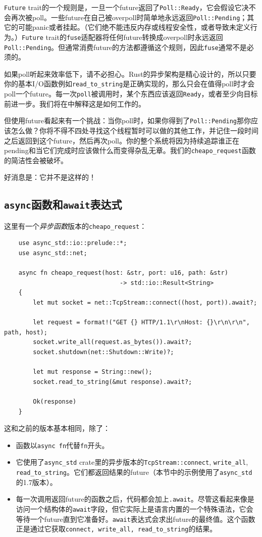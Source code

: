 \texttt{Future} trait的一个规则是，一旦一个future返回了\texttt{Poll::Ready}，它会假设它决不会再次被poll。一些future在自己被overpoll时简单地永远返回\texttt{Poll::Pending}；其它的可能panic或者挂起。（它们绝不能违反内存或线程安全性，或者导致未定义行为。）\texttt{Future} trait的\texttt{fuse}适配器将任何future转换成overpoll时永远返回\texttt{Poll::Pending}。但通常消费future的方法都遵循这个规则，因此\texttt{fuse}通常不是必须的。

如果poll听起来效率低下，请不必担心。Rust的异步架构是精心设计的，所以只要你的基本I/O函数例如\texttt{read\_to\_string}是正确实现的，那么只会在值得poll时才会poll一个future。每一次\texttt{poll}被调用时，某个东西应该返回\texttt{Ready}，或者至少向目标前进一步。我们将在中解释这是如何工作的。

但使用future看起来有一个挑战：当你poll时，如果你得到了\texttt{Poll::Pending}那你应该怎么做？你将不得不四处寻找这个线程暂时可以做的其他工作，并记住一段时间之后返回到这个future，然后再次poll。你的整个系统将因为持续追踪谁正在pending和当它们完成时应该做什么而变得杂乱无章。我们的\texttt{cheapo\_request}函数的简洁性会被破坏。

好消息是：它并不是这样的！

\subsection{\texttt{async}函数和\texttt{await}表达式}
这里有一个\emph{异步函数}版本的\texttt{cheapo\_request}：
\begin{verbatim}
    use async_std::io::prelude::*;
    use async_std::net;

    async fn cheapo_request(host: &str, port: u16, path: &str)
                                -> std::io::Result<String>
    {
        let mut socket = net::TcpStream::connect((host, port)).await?;

        let request = format!("GET {} HTTP/1.1\r\nHost: {}\r\n\r\n", path, host);
        socket.write_all(request.as_bytes()).await?;
        socket.shutdown(net::Shutdown::Write)?;

        let mut response = String::new();
        socket.read_to_string(&mut response).await?;

        Ok(response)
    }
\end{verbatim}

这和之前的版本基本相同，除了：
\begin{itemize}
    \item 函数以\texttt{async fn}代替\texttt{fn}开头。
    \item 它使用了\texttt{async\_std} crate里的异步版本的\texttt{TcpStream::connect}, \texttt{write\_all}, \\
    \texttt{read\_to\_string}。它们都返回结果的future（本节中的示例使用了\texttt{async\_std}的1.7版本）。
    \item 每一次调用返回future的函数之后，代码都会加上\texttt{.await}。尽管这看起来像是访问一个结构体的\texttt{await}字段，但它实际上是语言内置的一个特殊语法，它会等待一个future直到它准备好。\texttt{await}表达式会求出future的最终值。这个函数正是通过它获取\texttt{connect, write\_all, read\_to\_string}的结果。
\end{itemize}

